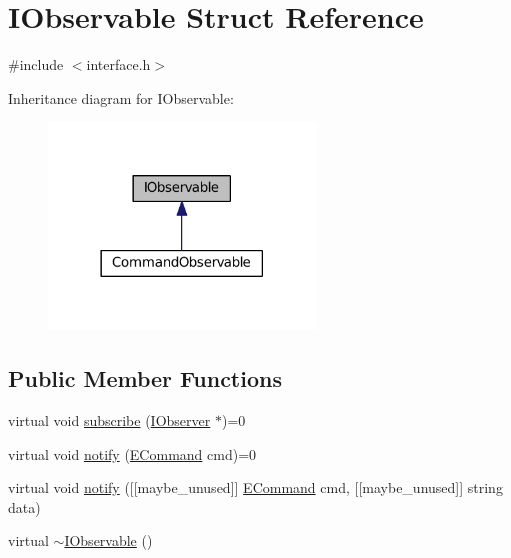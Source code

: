 \hypertarget{struct_i_observable}{}\section{I\+Observable Struct Reference}
\label{struct_i_observable}


{\ttfamily \#include $<$interface.\+h$>$}



Inheritance diagram for I\+Observable\+:
\nopagebreak
\begin{figure}[H]
\begin{center}
\leavevmode
\includegraphics[width=201pt]{struct_i_observable__inherit__graph}
\end{center}
\end{figure}
\subsection*{Public Member Functions}
\begin{DoxyCompactItemize}
\item 
virtual void \hyperlink{struct_i_observable_a20ae9c2f2d4618af71f8eae770f2cadd}{subscribe} (\hyperlink{struct_i_observer}{I\+Observer} $\ast$)=0
\item 
virtual void \hyperlink{struct_i_observable_a639f160d68e626515e6d977f813c3b09}{notify} (\hyperlink{interface_8h_aa299181f275f76f11365a410f7429098}{E\+Command} cmd)=0
\item 
virtual void \hyperlink{struct_i_observable_a457791f8021b05c51ec51193e0392fd3}{notify} (\mbox{[}\mbox{[}maybe\+\_\+unused\mbox{]}\mbox{]} \hyperlink{interface_8h_aa299181f275f76f11365a410f7429098}{E\+Command} cmd, \mbox{[}\mbox{[}maybe\+\_\+unused\mbox{]}\mbox{]} string data)
\item 
virtual \hyperlink{struct_i_observable_ae41e5a178a9ca6a4b83433ffea1d1ce1}{$\sim$\+I\+Observable} ()
\end{DoxyCompactItemize}


